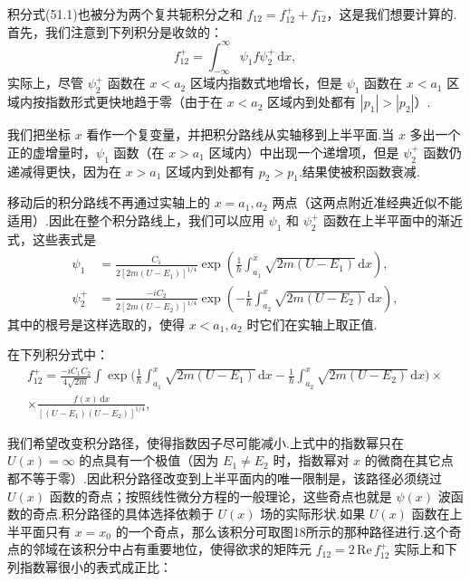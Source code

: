 积分式(51.1)也被分为两个复共轭积分之和 $f_{12}=f_{12}^++f_{12}^-$，这是我们想要计算的.首先，我们注意到下列积分是收敛的：
\begin{equation*}
  f_{12}^+=\int_{-\infty}^{\infty}\psi_1 f\psi_2^+\,\mathrm{d}x,
\end{equation*}
实际上，尽管 $\psi_2^+$ 函数在 $x<a_2$ 区域内指数式地增长，但是 $\psi_1$ 函数在 $x<a_1$ 区域内按指数形式更快地趋于零（由于在 $x<a_2$ 区域内到处都有 $|p_1|>|p_2|$）.

我们把坐标 $x$ 看作一个复变量，并把积分路线从实轴移到上半平面.当 $x$ 多出一个正的虚增量时，$\psi_1$ 函数（在 $x>a_1$ 区域内）中出现一个递增项，但是 $\psi_2^+$ 函数仍递减得更快，因为在 $x>a_1$ 区域内到处都有 $p_2>p_1$.结果使被积函数衰减.

移动后的积分路线不再通过实轴上的 $x=a_1,a_2$ 两点（这两点附近准经典近似不能适用）.因此在整个积分路线上，我们可以应用 $\psi_1$ 和 $\psi_2^+$ 函数在上半平面中的渐近式，这些表式是
\begin{equation}
\begin{aligned}
  \psi_1&=\frac{C_1}{2\left[2m(U-E_1)\right]^{1/4}}\exp\left(\frac{1}{\hbar}
  \int_{a_1}^x\sqrt{2m(U-E_1)}\,\mathrm{d}x\right),\\
  \psi_2^+&=\frac{-iC_2}{2\left[2m(U-E_2)\right]^{1/4}}\exp\left(-\frac{1}{\hbar}
  \int_{a_2}^x\sqrt{2m(U-E_2)}\,\mathrm{d}x\right),
\end{aligned}
\end{equation}
其中的根号是这样选取的，使得 $x<a_1,a_2$ 时它们在实轴上取正值.

在下列积分式中：
\begin{equation}
\begin{aligned}
  f_{12}^+=\frac{-iC_1C_2}{4\sqrt{2m}}\int\exp\bigg(\frac{1}{\hbar}
  \int_{a_1}^x\sqrt{2m(U-E_1)}\,\mathrm{d}x
  -\frac{1}{\hbar}\int_{a_2}^x\sqrt{2m(U-E_2)}\,\mathrm{d}x\bigg)\times\\
  \times\frac{f(x)\,\mathrm{d}x}{\left[(U-E_1)(U-E_2)\right]^{1/4}},
\end{aligned}
\end{equation}

我们希望改变积分路径，使得指数因子尽可能减小.上式中的指数幂只在 $U(x)=\infty$ 的点具有一个极值（因为 $E_1\neq E_2$ 时，指数幂对 $x$ 的微商在其它点都不等于零）.因此积分路径改变到上半平面内的唯一限制是，该路径必须绕过 $U(x)$ 函数的奇点；按照线性微分方程的一般理论，这些奇点也就是 $\psi(x)$ 波函数的奇点.积分路径的具体选择依赖于 $U(x)$ 场的实际形状.如果 $U(x)$ 函数在上半平面只有 $x=x_0$ 的一个奇点，那么该积分可取图18所示的那种路径进行.这个奇点的邻域在该积分中占有重要地位，使得欲求的矩阵元 $f_{12}=2\,\mathrm{Re}\,f_{12}^+$ 实际上和下列指数幂很小的表式成正比：

